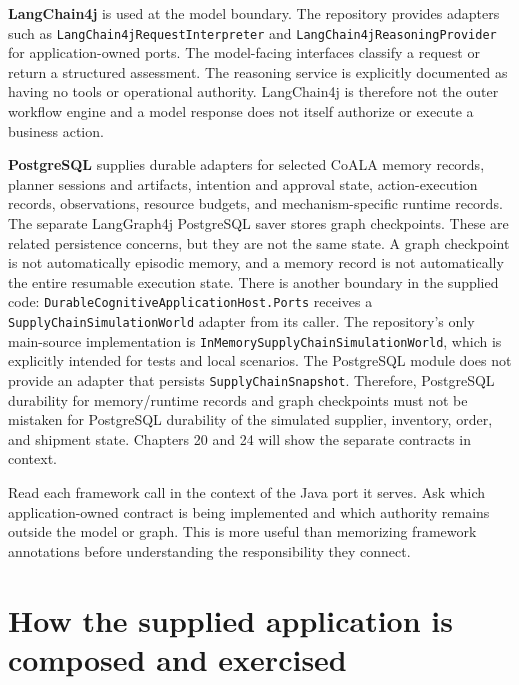 \textbf{LangChain4j} is used at the model boundary. The repository provides adapters such as \texttt{LangChain4jRequest\allowbreak{}Interpreter} and \texttt{LangChain4jReasoning\allowbreak{}Provider} for application-owned ports. The model-facing interfaces classify a request or return a structured assessment. The reasoning service is explicitly documented as having no tools or operational authority. LangChain4j is therefore not the outer workflow engine and a model response does not itself authorize or execute a business action.

\textbf{PostgreSQL} supplies durable adapters for selected CoALA memory records, planner sessions and artifacts, intention and approval state, action-execution records, observations, resource budgets, and mechanism-specific runtime records. The separate LangGraph4j PostgreSQL saver stores graph checkpoints. These are related persistence concerns, but they are not the same state. A graph checkpoint is not automatically episodic memory, and a memory record is not automatically the entire resumable execution state. There is another boundary in the supplied code: \texttt{DurableCognitive\allowbreak{}ApplicationHost.Ports} receives a \texttt{SupplyChain\allowbreak{}SimulationWorld} adapter from its caller. The repository's only main-source implementation is \texttt{InMemory\allowbreak{}SupplyChain\allowbreak{}SimulationWorld}, which is explicitly intended for tests and local scenarios. The PostgreSQL module does not provide an adapter that persists \texttt{SupplyChainSnapshot}. Therefore, PostgreSQL durability for memory/runtime records and graph checkpoints must not be mistaken for PostgreSQL durability of the simulated supplier, inventory, order, and shipment state. Chapters 20 and 24 will show the separate contracts in context.

\begin{tipbox}
Read each framework call in the context of the Java port it serves. Ask which application-owned contract is being implemented and which authority remains outside the model or graph. This is more useful than memorizing framework annotations before understanding the responsibility they connect.
\end{tipbox}

\section{How the supplied application is composed and exercised}
\label{sec:ch19-application-composition}

